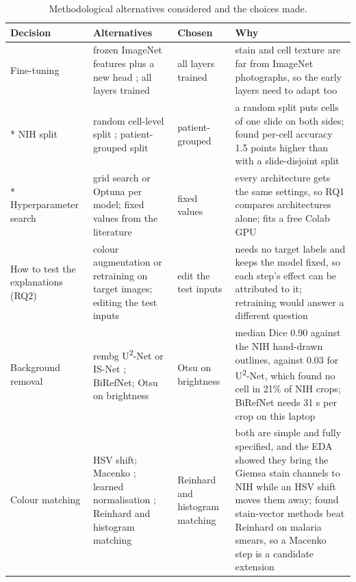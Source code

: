 \documentclass[11pt,a4paper]{article}
\begin{document}
{\footnotesize
\begin{longtable}{@{}>{\raggedright\arraybackslash\hspace{0pt}}p{70.9pt}>{\raggedright\arraybackslash\hspace{0pt}}p{78.0pt}>{\raggedright\arraybackslash\hspace{0pt}}p{65.5pt}>{\raggedright\arraybackslash\hspace{0pt}}p{97.6pt}@{}}
\toprule
Decision & Alternatives & Chosen & Why \\
\midrule
\endhead
\bottomrule
\endfoot
\bottomrule
\caption{Methodological alternatives considered and the choices made.}
\endlastfoot
Fine-tuning & frozen ImageNet features plus a new head \citep{rajaraman2018}; all layers trained & all layers trained & stain and cell texture are far from ImageNet photographs, so the early layers need to adapt too \\*
NIH split & random cell-level split \citep{zhao2020}; patient-grouped split & patient-grouped & a random split puts cells of one slide on both sides; \citet{hou2026} found per-cell accuracy 1.5 points higher than with a slide-disjoint split \\*
Hyperparameter search & grid search or Optuna per model; fixed values from the literature & fixed values & every architecture gets the same settings, so RQ1 compares architectures alone; fits a free Colab GPU \\
How to test the explanations (RQ2) & colour augmentation or retraining on target images; editing the test inputs & edit the test inputs & needs no target labels and keeps the model fixed, so each step's effect can be attributed to it; retraining would answer a different question \\
Background removal & rembg U\textsuperscript{2}-Net or IS-Net \citep{qin2020}; BiRefNet; Otsu on brightness & Otsu on brightness & median Dice 0.90 against the NIH hand-drawn outlines, against 0.03 for U\textsuperscript{2}-Net, which found no cell in 21\% of NIH crops; BiRefNet needs 31 s per crop on this laptop \\
Colour matching & HSV shift; Macenko \citep{macenko2009}; learned normalisation \citep{xu2025}; Reinhard and histogram matching & Reinhard and histogram matching & both are simple and fully specified, and the EDA showed they bring the Giemsa stain channels to NIH while an HSV shift moves them away; \citet{xu2025} found stain-vector methods beat Reinhard on malaria smears, so a Macenko step is a candidate extension \\

\end{longtable}}
\end{document}
